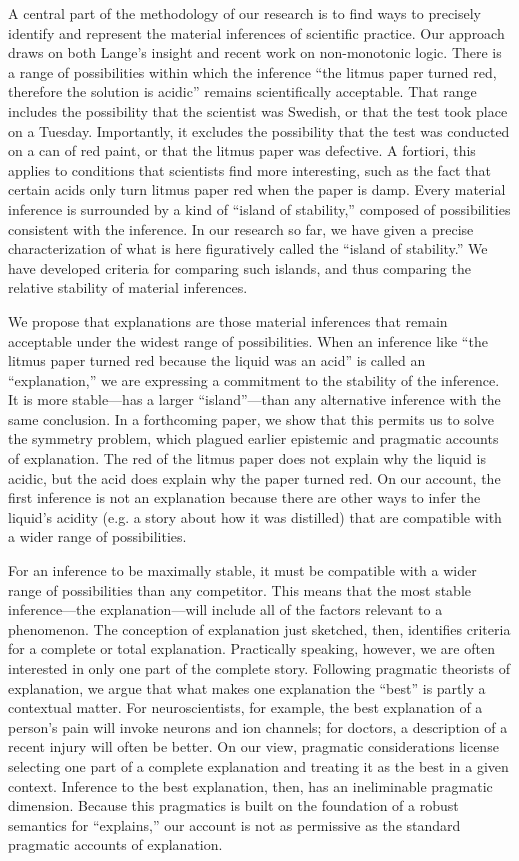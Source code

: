 \documentclass{article}[11pt]
\begin{document}
A central part of the methodology of our research is to find ways to precisely identify and represent the material inferences of scientific practice.  Our approach draws on both Lange's insight and recent work on non-monotonic logic.   There is a range of possibilities within which the inference ``the litmus paper turned red, therefore the solution is acidic''  remains scientifically acceptable.  That range includes the possibility that the scientist was Swedish, or that the test took place on a Tuesday.  Importantly, it excludes the possibility that the test was conducted on a can of red paint, or that the litmus paper was defective. A fortiori, this applies to conditions that scientists find more interesting, such as the fact that certain acids only turn litmus paper red when the paper is damp. Every material inference is surrounded by a kind of ``island of stability,'' composed of possibilities consistent with the inference.  In our research so far, we have given a precise characterization of what is here figuratively called the ``island of stability.''   We have developed criteria for comparing such islands, and thus comparing the relative stability of material inferences. 

We propose that explanations are those material inferences that remain acceptable under the widest range of possibilities.  When an inference like ``the litmus paper turned red  because the liquid was an acid'' is called an ``explanation,'' we are expressing a commitment to the stability of the inference.  It is more stable---has a larger ``island''---than any alternative inference with the same conclusion. In a forthcoming paper, we show that this permits us to solve the symmetry problem, which plagued earlier epistemic and pragmatic accounts of explanation.  The red of the litmus paper does not explain why the liquid is acidic, but the acid does explain why the paper turned red.  On our account, the first inference is not an explanation because there are other ways to infer the liquid's acidity (e.g. a story about how it was distilled) that are compatible with a wider range of possibilities.  

For an inference to be maximally stable,  it must be compatible with a wider range of possibilities than any competitor.  This means that the most stable inference---the explanation---will include all of the factors relevant to a phenomenon. The conception of explanation just sketched, then, identifies criteria for a complete or total explanation. Practically speaking, however, we are often interested in only one part of the complete story. Following pragmatic theorists of explanation, we argue that what makes one explanation the ``best'' is partly a contextual matter.  For neuroscientists, for example, the best explanation of a person’s pain will invoke neurons and ion channels; for doctors, a description of a recent injury will often be better. On our view, pragmatic considerations license selecting one part of a complete explanation and treating it as the best in a given context.  Inference to the best explanation, then, has an ineliminable pragmatic dimension. Because this pragmatics is built on the foundation of a robust semantics for ``explains,'' our account is not as permissive as the standard pragmatic accounts of explanation.
\end{document}
